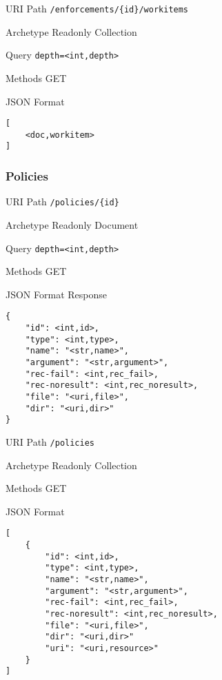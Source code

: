 \documentclass[10pt,a4paper]{scrartcl}
\begin{document}
\begin{mdframed}[style=def]
\begin{description*}
	\item[URI Path] \texttt{/enforcements/\{id\}/workitems}
	\item[Archetype] Readonly Collection
	\item[Query] \texttt{depth=<int,depth>}
	\item[Methods] GET
	\item[JSON Format] \hfill
\begin{lstlisting}
[
	<doc,workitem>
]
\end{lstlisting}
\end{description*}
\end{mdframed}

\pagebreak
\subsubsection{Policies}

\begin{mdframed}[style=def]
\begin{description*}
	\item[URI Path] \texttt{/policies/\{id\}}
	\item[Archetype] Readonly Document
	\item[Query] \texttt{depth=<int,depth>}
	\item[Methods] GET
	\item[JSON Format Response] \hfill
\begin{lstlisting}
{
	"id": <int,id>,
	"type": <int,type>,
	"name": "<str,name>",
	"argument": "<str,argument>",
	"rec-fail": <int,rec_fail>,
	"rec-noresult": <int,rec_noresult>, 
	"file": "<uri,file>",
	"dir": "<uri,dir>"
}
\end{lstlisting}
\end{description*}
\end{mdframed}

\begin{mdframed}[style=def]
\begin{description*}
	\item[URI Path] \texttt{/policies}
	\item[Archetype] Readonly Collection
	\item[Methods] GET
	\item[JSON Format] \hfill
\begin{lstlisting}
[
	{
		"id": <int,id>,
		"type": <int,type>,
		"name": "<str,name>",
		"argument": "<str,argument>",
		"rec-fail": <int,rec_fail>,
		"rec-noresult": <int,rec_noresult>, 
		"file": "<uri,file>",
		"dir": "<uri,dir>"	
		"uri": "<uri,resource>"
	}
]
\end{lstlisting}
\end{description*}
\end{mdframed}
\end{document}
